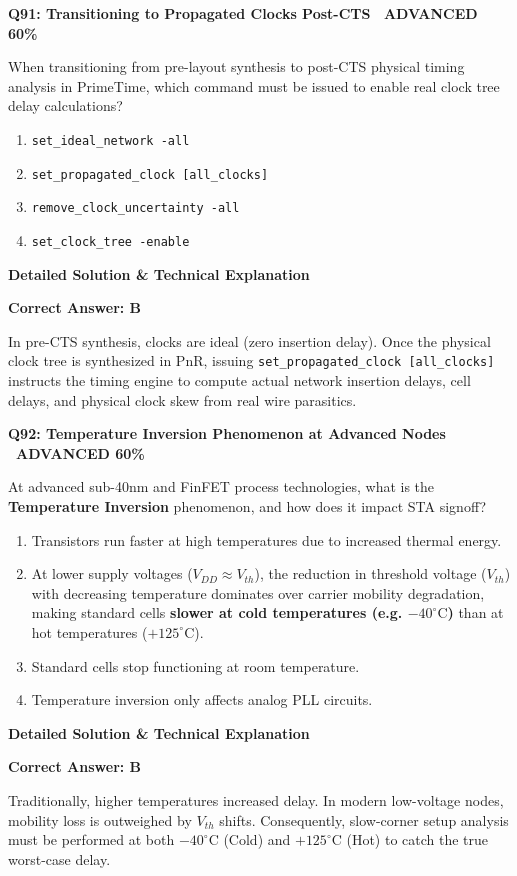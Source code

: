 \documentclass[11pt,a4paper]{article}
\newcommand{\badgeadv}{{\color{white}\colorbox{advred}{\bfseries\sffamily\tiny\ ADVANCED 60\%\ }}}
\newenvironment{qbox}[2]{%
  \begin{mdframed}[style=qstyle]%
  {\bfseries\sffamily\color{primaryblue}#1 \hfill #2}\par\vspace{2pt}%
}{%
  \end{mdframed}%
}
\newenvironment{ansbox}{%
  \begin{mdframed}[style=ansstyle]%
  {\bfseries\sffamily\color{ansgreen}\small Detailed Solution \& Technical Explanation}\par\vspace{2pt}\small%
}{%
  \end{mdframed}%
}
\begin{document}
\begin{qbox}{Q91: Transitioning to Propagated Clocks Post-CTS}{\badgeadv}
When transitioning from pre-layout synthesis to post-CTS physical timing analysis in PrimeTime, which command must be issued to enable real clock tree delay calculations?
\begin{enumerate}[label=\textbf{\Alph*.}]
  \item \texttt{set\_ideal\_network -all}
  \item \texttt{set\_propagated\_clock [all\_clocks]}
  \item \texttt{remove\_clock\_uncertainty -all}
  \item \texttt{set\_clock\_tree -enable}
\end{enumerate}
\end{qbox}
\begin{ansbox}
\textbf{Correct Answer: B}

In pre-CTS synthesis, clocks are ideal (zero insertion delay). Once the physical clock tree is synthesized in PnR, issuing \texttt{set\_propagated\_clock [all\_clocks]} instructs the timing engine to compute actual network insertion delays, cell delays, and physical clock skew from real wire parasitics.
\end{ansbox}

\begin{qbox}{Q92: Temperature Inversion Phenomenon at Advanced Nodes}{\badgeadv}
At advanced sub-40nm and FinFET process technologies, what is the \textbf{Temperature Inversion} phenomenon, and how does it impact STA signoff?
\begin{enumerate}[label=\textbf{\Alph*.}]
  \item Transistors run faster at high temperatures due to increased thermal energy.
  \item At lower supply voltages ($V_{DD} \approx V_{th}$), the reduction in threshold voltage ($V_{th}$) with decreasing temperature dominates over carrier mobility degradation, making standard cells \textbf{slower at cold temperatures (e.g. $-40^\circ\text{C}$)} than at hot temperatures ($+125^\circ\text{C}$).
  \item Standard cells stop functioning at room temperature.
  \item Temperature inversion only affects analog PLL circuits.
\end{enumerate}
\end{qbox}
\begin{ansbox}
\textbf{Correct Answer: B}

Traditionally, higher temperatures increased delay. In modern low-voltage nodes, mobility loss is outweighed by $V_{th}$ shifts. Consequently, slow-corner setup analysis must be performed at both $-40^\circ\text{C}$ (Cold) and $+125^\circ\text{C}$ (Hot) to catch the true worst-case delay.
\end{ansbox}
\end{document}
